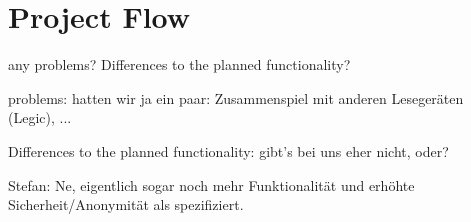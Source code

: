 \section{Project Flow}\label{sec:project_flow}

any problems? Differences to the planned functionality?

problems:
hatten wir ja ein paar: Zusammenspiel mit anderen Lesegeräten (Legic), ...


Differences to the planned functionality:
gibt's bei uns eher nicht, oder?

Stefan: Ne, eigentlich sogar noch mehr Funktionalität und erhöhte Sicherheit/Anonymität als spezifiziert.